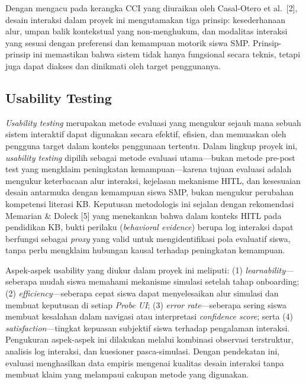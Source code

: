 \documentclass[12pt,oneside]{report}
\begin{document}
Dengan mengacu pada kerangka CCI yang diuraikan oleh Casal-Otero et al.\ [2], desain interaksi dalam proyek ini mengutamakan tiga prinsip: kesederhanaan alur, umpan balik kontekstual yang non-menghukum, dan modalitas interaksi yang sesuai dengan preferensi dan kemampuan motorik siswa SMP. Prinsip-prinsip ini memastikan bahwa sistem tidak hanya fungsional secara teknis, tetapi juga dapat diakses dan dinikmati oleh target penggunanya.

\subsection{Usability Testing}
\label{subsec:usability-testing}

\textit{Usability testing} merupakan metode evaluasi yang mengukur sejauh mana sebuah sistem interaktif dapat digunakan secara efektif, efisien, dan memuaskan oleh pengguna target dalam konteks penggunaan tertentu. Dalam lingkup proyek ini, \textit{usability testing} dipilih sebagai metode evaluasi utama---bukan metode pre-post test yang mengklaim peningkatan kemampuan---karena tujuan evaluasi adalah mengukur keterbacaan alur interaksi, kejelasan mekanisme HITL, dan kesesuaian desain antarmuka dengan kemampuan siswa SMP, bukan mengukur perubahan kompetensi literasi KB. Keputusan metodologis ini sejalan dengan rekomendasi Memarian \& Doleck [5] yang menekankan bahwa dalam konteks HITL pada pendidikan KB, bukti perilaku (\textit{behavioral evidence}) berupa log interaksi dapat berfungsi sebagai \textit{proxy} yang valid untuk mengidentifikasi pola evaluatif siswa, tanpa perlu mengklaim hubungan kausal terhadap peningkatan kemampuan.

Aspek-aspek usability yang diukur dalam proyek ini meliputi: (1) \textit{learnability}---seberapa mudah siswa memahami mekanisme simulasi setelah tahap onboarding; (2) \textit{efficiency}---seberapa cepat siswa dapat menyelesaikan alur simulasi dan membuat keputusan di setiap \textit{Probe UI}; (3) \textit{error rate}---seberapa sering siswa membuat kesalahan dalam navigasi atau interpretasi \textit{confidence score}; serta (4) \textit{satisfaction}---tingkat kepuasan subjektif siswa terhadap pengalaman interaksi. Pengukuran aspek-aspek ini dilakukan melalui kombinasi observasi terstruktur, analisis log interaksi, dan kuesioner pasca-simulasi. Dengan pendekatan ini, evaluasi menghasilkan data empiris mengenai kualitas desain interaksi tanpa membuat klaim yang melampaui cakupan metode yang digunakan.
\end{document}
